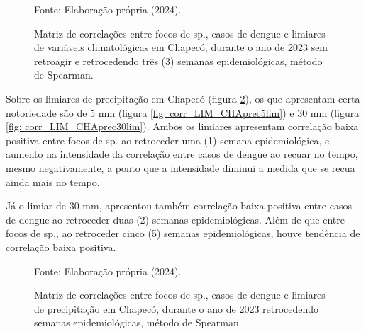 \begin{figure}[htbp]
    \begin{center}
    \caption{Matriz de correlações entre focos de  sp., casos de dengue e limiares de variáveis climatológicas em Chapecó, durante o ano de 2023 sem retroagir e retrocedendo três (3) semanas epidemiológicas, método de Spearman.}
    \label{fig: matriz_corr_LIM_CHAretro}
        \hfill
    \end{center}
    \small{Fonte: Elaboração própria (2024).}
\end{figure}

\indent Sobre os limiares de precipitação em Chapecó (figura \ref{fig: matriz_corr_LIM_CHAprec}), os que apresentam certa notoriedade são de 5 mm (figura \ref{fig: corr_LIM_CHAprec5lim}) e 30 mm (figura \ref{fig: corr_LIM_CHAprec30lim}). Ambos os limiares apresentam correlação baixa positiva entre focos de  sp. ao retroceder uma (1) semana epidemiológica, e aumento na intensidade da correlação entre casos de dengue ao recuar no tempo, mesmo negativamente, a ponto que a intensidade diminui a medida que se recua ainda mais no tempo.


\indent Já o limiar de 30 mm, apresentou também correlação baixa positiva entre casos de dengue ao retroceder duas (2) semanas epidemiológicas. Além de que entre focos de  sp., ao retroceder cinco (5) semanas epidemiológicas, houve tendência de correlação baixa positiva.

\begin{figure}[htbp]
    \begin{center}
    \caption{Matriz de correlações entre focos de  sp., casos de dengue e limiares de precipitação em Chapecó, durante o ano de 2023 retrocedendo semanas epidemiológicas, método de Spearman.}
    \label{fig: matriz_corr_LIM_CHAprec}
        \hfill
    \end{center}
    \small{Fonte: Elaboração própria (2024).}
\end{figure}

